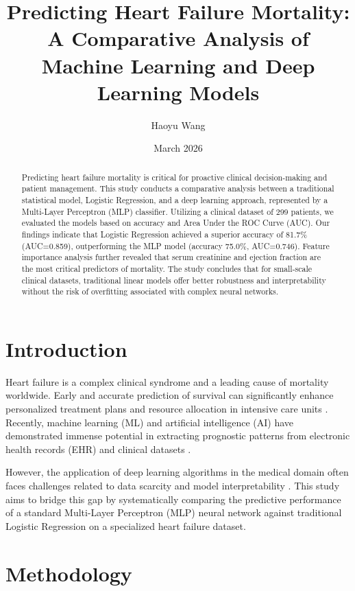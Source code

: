 \documentclass[12pt, a4paper]{article}
\title{\textbf{Predicting Heart Failure Mortality: A Comparative Analysis of Machine Learning and Deep Learning Models}}
\author{Haoyu Wang}
\date{March 2026}
\begin{document}
\maketitle

\begin{abstract}
Predicting heart failure mortality is critical for proactive clinical decision-making and patient management. This study conducts a comparative analysis between a traditional statistical model, Logistic Regression, and a deep learning approach, represented by a Multi-Layer Perceptron (MLP) classifier. Utilizing a clinical dataset of 299 patients, we evaluated the models based on accuracy and Area Under the ROC Curve (AUC). Our findings indicate that Logistic Regression achieved a superior accuracy of 81.7\% (AUC=0.859), outperforming the MLP model (accuracy 75.0\%, AUC=0.746). Feature importance analysis further revealed that serum creatinine and ejection fraction are the most critical predictors of mortality. The study concludes that for small-scale clinical datasets, traditional linear models offer better robustness and interpretability without the risk of overfitting associated with complex neural networks.
\end{abstract}

\section{Introduction}
Heart failure is a complex clinical syndrome and a leading cause of mortality worldwide. Early and accurate prediction of survival can significantly enhance personalized treatment plans and resource allocation in intensive care units \cite{chicco2020}. Recently, machine learning (ML) and artificial intelligence (AI) have demonstrated immense potential in extracting prognostic patterns from electronic health records (EHR) and clinical datasets \cite{obermeyer2016}. 

However, the application of deep learning algorithms in the medical domain often faces challenges related to data scarcity and model interpretability \cite{rajkomar2018}. This study aims to bridge this gap by systematically comparing the predictive performance of a standard Multi-Layer Perceptron (MLP) neural network against traditional Logistic Regression on a specialized heart failure dataset.

\section{Methodology}
\end{document}
